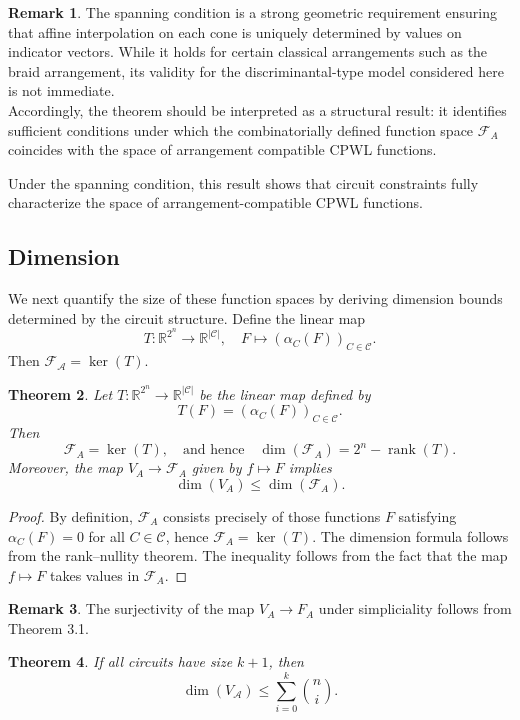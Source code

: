 \documentclass{amsart}
\newtheorem{theorem}{Theorem}[section]
\theoremstyle{definition}
\newtheorem{remark}[theorem]{Remark}
\begin{document}
\begin{remark}
The spanning condition is a strong geometric requirement ensuring that affine interpolation on each cone is uniquely determined by values on indicator vectors. While it holds for certain classical arrangements such as the braid arrangement, its validity for the discriminantal-type model considered here is not immediate.\\
\noindent
Accordingly, the theorem should be interpreted as a structural result: it identifies sufficient conditions under which the combinatorially defined function space $\mathcal{F}_A$ coincides with the space of arrangement compatible CPWL functions.
\end{remark}
\noindent
Under the spanning condition, this result shows that circuit constraints fully characterize the space of arrangement-compatible CPWL functions.

\subsection{Dimension}
We next quantify the size of these function spaces by deriving dimension bounds determined by the circuit structure.
Define the linear map
\[
T : \mathbb{R}^{2^n} \to \mathbb{R}^{|\mathcal{C}|}, \quad F \mapsto (\alpha_C(F))_{C \in \mathcal{C}}.
\]
\noindent
Then $\mathcal{F}_{\mathcal{A}} = \ker(T)$.

\begin{theorem}
Let $T : \mathbb{R}^{2^n} \to \mathbb{R}^{|\mathcal{C}|}$ be the linear map defined by
\[
T(F) = (\alpha_C(F))_{C \in \mathcal{C}}.
\]
Then
\[
\mathcal{F}_A = \ker(T),
\quad \text{and hence} \quad
\dim(\mathcal{F}_A) = 2^n - \operatorname{rank}(T).
\]
Moreover, the map $V_A \to \mathcal{F}_A$ given by $f \mapsto F$ implies
\[
\dim(V_A) \leq \dim(\mathcal{F}_A).
\]
\end{theorem}

\begin{proof}
By definition, $\mathcal{F}_A$ consists precisely of those functions $F$ satisfying $\alpha_C(F)=0$ for all $C \in \mathcal{C}$, hence $\mathcal{F}_A = \ker(T)$. The dimension formula follows from the rank--nullity theorem. The inequality follows from the fact that the map $f \mapsto F$ takes values in $\mathcal{F}_A$.
\end{proof}
\begin{remark}
The surjectivity of the map $V_A \to F_A$ under simpliciality follows from Theorem 3.1.
\end{remark}
\begin{theorem}
If all circuits have size $k+1$, then
\[
\dim(V_{\mathcal{A}}) \le \sum_{i=0}^{k} \binom{n}{i}.
\]
\end{theorem}
\end{document}

